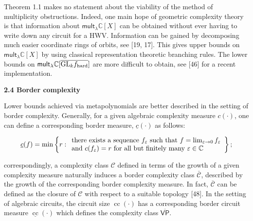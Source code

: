 \documentclass[10pt,a4paper]{article}
\begin{document}
Theorem 1.1 makes no statement about the viability of the method of multiplicity obstructions. Indeed, one main hope of geometric complexity theory is that information about $\mathsf{mult}_{\lambda}\mathbb{C}[X]$ can be obtained
without ever having to write down any circuit for a HWV.
Information can be gained
by decomposing much easier coordinate rings of orbits, see [19, 17]. This gives upper bounds on $\mathsf{mult}_{\lambda}\mathbb{C}[X]$ by using classical representation theoretic branching rules. The lower bounds on $\mathsf{mult}_{\lambda}\mathbb{C}[\overline{\textnormal{GL}_{k}f_{\textup{hard}}}]$ are more difficult to obtain, see [46] for a recent implementation.






\par\medskip\noindent\textbf{2.4 Border complexity}\par




Lower bounds achieved via metapolynomials are better described in the setting of border complexity. Generally, for a given algebraic complexity measure $c(\cdot)$, one can define a corresponding border measure, $\underline{c}(\cdot)$ as follows:



\[\begin{aligned}
\underline{c}(f)=\min\left\{r:\begin{array}[]{l}\text{there exists a sequence $f_{\varepsilon}$ such that $f=\lim_{\varepsilon\to 0}f_{\varepsilon}$}\\ \text{and $c(f_{\varepsilon})=r$ for all but finitely many $\varepsilon\in\mathbb{C}$}\end{array}\right\};
\end{aligned}\]


correspondingly, a complexity class $\mathcal{C}$ defined in terms of the growth of a given complexity measure naturally induces a border complexity class $\bar{\mathcal{C}}$, described by the growth of the corresponding border complexity measure. In fact, $\bar{\mathcal{C}}$ can be defined as the closure of $\mathcal{C}$ with respect to a suitable topology [48]. In the setting of algebraic circuits, the circuit size $\operatorname{cc}(\cdot)$ has a corresponding border circuit measure $\underline{\operatorname{cc}}(\cdot)$ which defines the complexity class $\overline{\mathsf{VP}}$.
\end{document}
